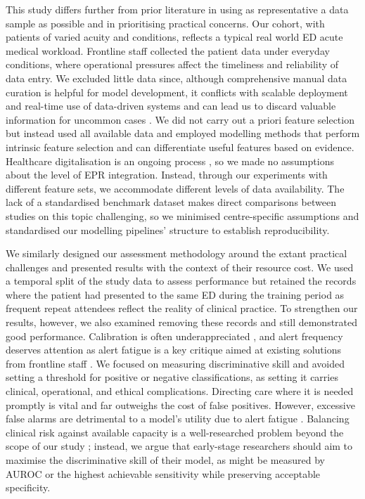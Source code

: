 \documentclass[fleqn,10pt]{wlscirep}
\begin{document}
This study differs further from prior literature in using as representative a data sample as possible and in prioritising practical concerns. Our cohort, with patients of varied acuity and conditions, reflects a typical real world ED acute medical workload. Frontline staff collected the patient data under everyday conditions, where operational pressures affect the timeliness and reliability of data entry. We excluded little data since, although comprehensive manual data curation is helpful for model development, it conflicts with scalable deployment and real-time use of data-driven systems \cite{Meyer18} and can lead us to discard valuable information for uncommon cases \cite{Rajkomar18}. We did not carry out a priori feature selection but instead used all available data and employed modelling methods that perform intrinsic feature selection and can differentiate useful features based on evidence. Healthcare digitalisation is an ongoing process \cite{NHS19}, so we made no assumptions about the level of EPR integration. Instead, through our experiments with different feature sets, we accommodate different levels of data availability. The lack of a standardised benchmark dataset makes direct comparisons between studies on this topic challenging, so we minimised centre-specific assumptions and standardised our modelling pipelines' structure to establish reproducibility.

We similarly designed our assessment methodology around the extant practical challenges and presented results with the context of their resource cost. We used a temporal split of the study data to assess performance but retained the records where the patient had presented to the same ED during the training period as frequent repeat attendees reflect the reality of clinical practice. To strengthen our results, however, we also examined removing these records and still demonstrated good performance. Calibration is often underappreciated \cite{Gerry20}, and alert frequency deserves attention as alert fatigue is a key critique aimed at existing solutions from frontline staff \cite{Obrien20}. We focused on measuring discriminative skill and avoided setting a threshold for positive or negative classifications, as setting it carries clinical, operational, and ethical complications. Directing care where it is needed promptly is vital and far outweighs the cost of false positives. However, excessive false alarms are detrimental to a model’s utility due to alert fatigue \cite{Ancker17, Kolic15, Bedoya19}. Balancing clinical risk against available capacity is a well-researched problem beyond the scope of our study \cite{Calster18, Azcarate20}; instead, we argue that early-stage researchers should aim to maximise the discriminative skill of their model, as might be measured by AUROC or the highest achievable sensitivity while preserving acceptable specificity.
\end{document}
